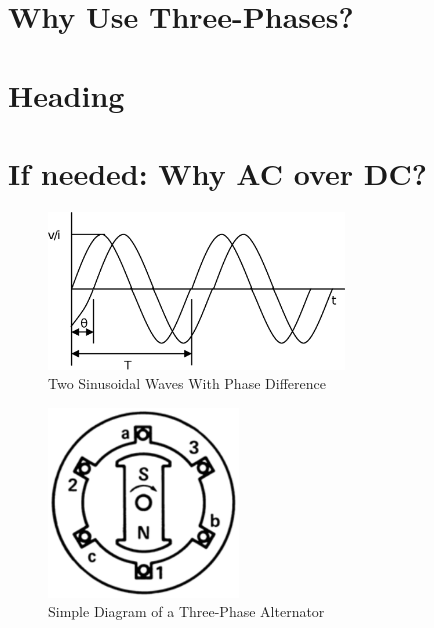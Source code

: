 \documentclass{article}
\begin{document}
  \section{Why Use Three-Phases?}

  \section{Heading}

  \section{If needed: Why AC over DC?}

  \begin{figure}
    \centering
    \includegraphics[width=0.7\textwidth]{acwave}
    \caption{Two Sinusoidal Waves With Phase Difference}
    \label{acwave}
  \end{figure}

  \begin{figure}
    \centering
    \includegraphics[width=0.45\textwidth]{threephasemotor}
    \caption{Simple Diagram of a Three-Phase Alternator}
    \label{alternator}
  \end{figure}
\end{document}
